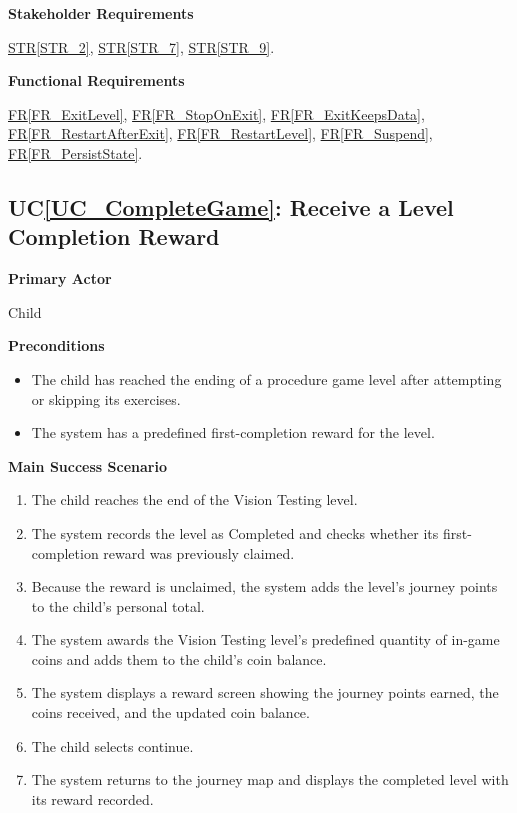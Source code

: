 \documentclass[10pt]{article}
\newcommand{\strref}[1]{\hyperref[#1]{STR\ref*{#1}}}
\newcounter{ucnum} %
\newcommand{\ucheading}[1]{UC\ref*{#1}}
\newcommand{\rref}[1]{\hyperref[#1]{FR\ref*{#1}}}
\begin{document}
\textbf{Stakeholder Requirements}

\strref{STR_2}, \strref{STR_7}, \strref{STR_9}.

\textbf{Functional Requirements}

\rref{FR_ExitLevel}, \rref{FR_StopOnExit}, \rref{FR_ExitKeepsData}, \rref{FR_RestartAfterExit}, \rref{FR_RestartLevel}, \rref{FR_Suspend}, \rref{FR_PersistState}.

\label{UC_CompleteGame}
\subsection{\ucheading{UC_CompleteGame}: Receive a Level Completion Reward}

\textbf{Primary Actor}

Child

\textbf{Preconditions}
\begin{itemize}
    \item The child has reached the ending of a procedure game level
    after attempting or skipping its exercises.
    \item The system has a predefined first-completion reward for
    the level.
\end{itemize}

\textbf{Main Success Scenario}
\begin{enumerate}
    \item The child reaches the end of the Vision Testing level.
    \item The system records the level as Completed and checks
    whether its first-completion reward was previously claimed.
    \item Because the reward is unclaimed, the system adds the
    level's journey points to the child's personal total.
    \item The system awards the Vision Testing level's predefined
    quantity of in-game coins and adds them to the child's coin balance.
    \item The system displays a reward screen showing the journey
    points earned, the coins received, and the updated coin balance.
    \item The child selects continue.
    \item The system returns to the journey map and displays the
    completed level with its reward recorded.
\end{enumerate}
\end{document}
